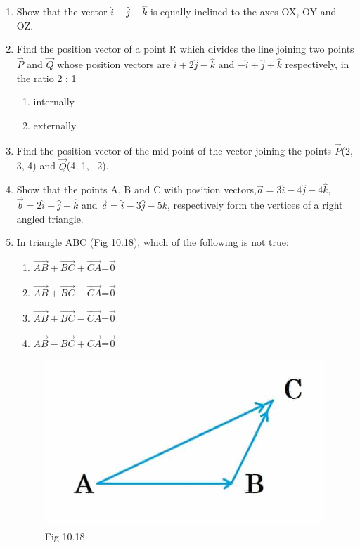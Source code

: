 \documentclass[12pt]{article}
\begin{document}
\begin{enumerate}
\item Show that the vector $\hat{i}+\hat{j}+\hat{k}$ is equally inclined to the axes OX, OY and OZ.
\item Find the position vector of a point R which divides the line joining two points $\Vec{P}$
and $\Vec{Q}$ whose position vectors are $\hat{i}+2\hat{j}-\hat{k}$ and $-\hat{i}+\hat{j}+\hat{k}$ respectively, in the
ratio 2 : 1
\begin{enumerate}[label=(\roman*)]
    \item  internally
    \item  externally
\end{enumerate}
\item Find the position vector of the mid point of the vector joining the points $\vec{P}$(2, 3, 4)
and $\vec{Q}$(4, 1, –2).
\item Show that the points A, B and C with position vectors,$\vec{a}=3\hat{i}-4\hat{j}-4\hat{k}$,$\vec{b}=2\hat{i}-\hat{j}+\hat{k}$ and $\vec{c}=\hat{i}-3\hat{j}-5\hat{k}$, respectively form the vertices of a right angled
triangle.
\item In triangle ABC (Fig 10.18), which of the following is not true:
 \begin{enumerate}
         \item $\overrightarrow{AB}+\overrightarrow{BC}+\overrightarrow{CA}$=$\vec{0}$
         \item $\overrightarrow{AB}+\overrightarrow{BC}-\overrightarrow{CA}$=$\vec{0}$
         \item $\overrightarrow{AB}+\overrightarrow{BC}-\overrightarrow{CA}$=$\vec{0}$
         \item $\overrightarrow{AB}-\overrightarrow{BC}+\overrightarrow{CA}$=$\vec{0}$
\end{enumerate}
\begin{figure}[!h]
\centering
  \includegraphics[width=\columnwidth]{tri.jpg}
\captionsetup{labelformat=empty}
\caption{Fig 10.18}
\label{(Fig 10.18)}
\end{figure}


\end{enumerate}
\end{document}
